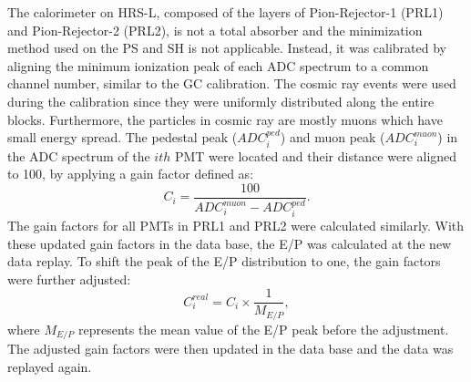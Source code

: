   The calorimeter on HRS-L, composed of the layers of Pion-Rejector-1 (PRL1) and Pion-Rejector-2 (PRL2), is not a total absorber and the minimization method used on the PS and SH is not applicable. Instead, it was calibrated by aligning the minimum ionization peak of each ADC spectrum to a common channel number, similar to the GC calibration. The cosmic ray events were used during the calibration since they were uniformly distributed along the entire blocks. Furthermore, the particles in cosmic ray are mostly muons which have small energy spread. The pedestal peak ($ADC_{i}^{ped}$) and muon peak ($ADC_{i}^{muon}$) in the ADC spectrum of the $ith$ PMT were located and their distance were aligned to 100, by applying a gain factor defined as:
\begin{equation}
  C_{i} = \frac{100}{ADC_{i}^{muon}-ADC_{i}^{ped}}.
\end{equation}
 The gain factors for all PMTs in PRL1 and PRL2 were calculated similarly. With these updated gain factors in the data base, the E/P was calculated at the new data replay. To shift the peak of the E/P distribution to one, the gain factors were further adjusted:
\begin{equation}
  C_{i}^{real} = C_{i} \times \frac{1}{M_{E/P}},
\end{equation}
where $M_{E/P}$ represents the mean value of the E/P peak before the adjustment. The adjusted gain factors were then updated in the data base and the data was replayed again.
